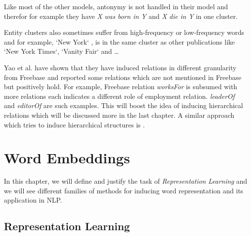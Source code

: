 \documentclass[12pt]{report}
\begin{document}
 Like most of the other models, antonymy is not handled in their model and therefor for example they have
 \emph{X was born in Y} and \emph{X die in Y} in one cluster.
 
 Entity clusters also sometimes suffer from high-frequency or low-frequency words and for example, `New York`
 , is in the same cluster as other publications like `New York Times`, `Vanity Fair` and \ldots
 
 Yao et al. have shown that they have induced relations in different granularity from Freebase and reported some relations
 which are not mentioned in Freebase but positively hold. For example, Freebase relation \emph{worksFor}
  is subsumed with more relations each indicates a different role of employment relation. \emph{leaderOf}
   and \emph{editorOf} are such examples. This will boost the idea of inducing hierarchical 
   relations which will be discussed more in the last chapter. A similar approach which tries to induce
    hierarchical structures is \cite{Alfonseca2012} .
 
 
\chapter{Word Embeddings}
\label{ch:word-embedding}

In this chapter, we will define and justify the task of
\emph{Representation Learning} and we will see different families of methods for
inducing word representation and its application in NLP.

\section{Representation Learning}
\label{sec:repr-learning}
\end{document}

